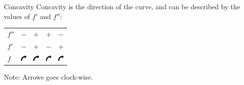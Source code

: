 \label{sec:concavity}
\begin{definition}
    {Concavity}
    Concavity is the direction of the curve, and can be described by the values of $f'$ and $f''$:
    \begin{table}[H]
        \begin{tabular}{lcccc}
            $f''$ & $-$                                                                & $+$                                                                & $+$                                                               & $-$                                                              \\
            $f'$  & $-$                                                                & $+$                                                                & $-$                                                               & $+$                                                              \\
            $f$   & \includegraphics[width=0.3cm,origin=c, angle=270]{./img/arrow.png} & \includegraphics[width=0.3cm,origin=c, angle=180]{./img/arrow.png} & \includegraphics[width=0.3cm,origin=c, angle=90]{./img/arrow.png} & \includegraphics[width=0.3cm,origin=c, angle=0]{./img/arrow.png}
        \end{tabular}
    \end{table}
    Note: Arrows goes clock-wise.
\end{definition}


